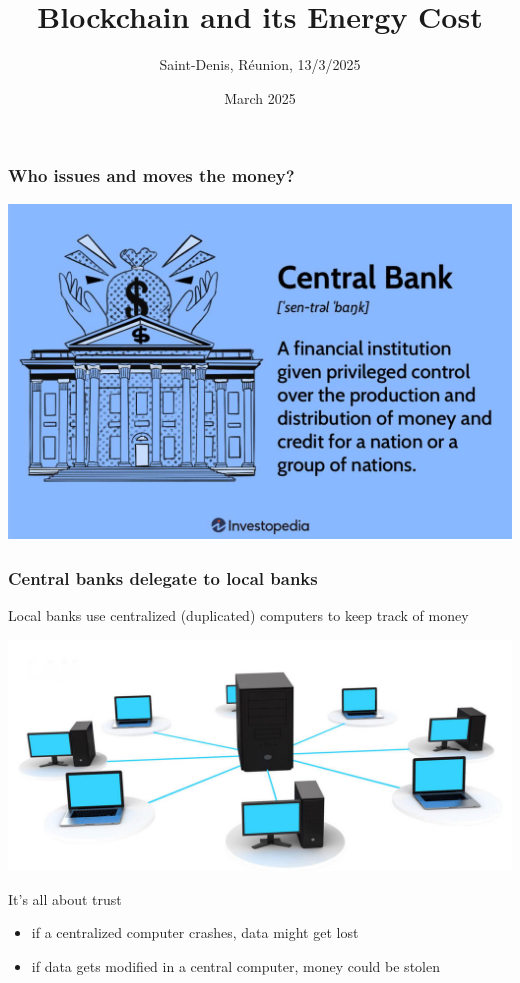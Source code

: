\documentclass[11pt]{beamer}  %
\subtitle{Saint-Denis, R\'eunion, 13/3/2025}
\title{Blockchain and its Energy Cost}
\institute{Universit\`a di Verona, Italy}
\date{March 2025}
\begin{document}
\begin{frame}
  \titlepage
\end{frame}

\begin{frame}\frametitle{Who issues and moves the money?}

  \begin{center}
    \includegraphics[scale=0.22,clip=false]{pictures/central-bank.jpg}
  \end{center}

\end{frame}

\begin{frame}\frametitle{Central banks delegate to local banks}

  Local banks use centralized (duplicated) computers to keep track of money

  \begin{center}
    \includegraphics[scale=0.22,clip=false]{pictures/centralized-network.jpg}
  \end{center}

  \begin{greenbox}{It's all about trust}
    \begin{itemize}
    \item if a centralized computer crashes, data might get lost
    \item if data gets modified in a central computer, money could be stolen
    \end{itemize}
  \end{greenbox}
  
\end{frame}
\end{document}
